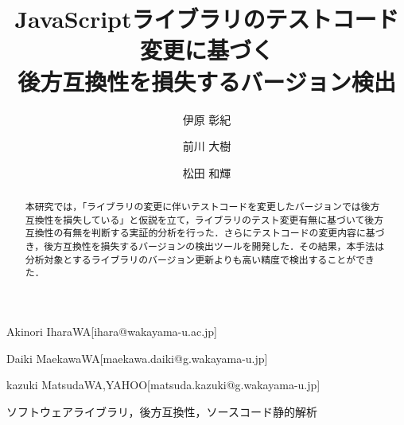 \documentclass[submit]{ipsj}
\begin{document}
\title{JavaScriptライブラリのテストコード変更に基づく\\後方互換性を損失するバージョン検出}





\author{伊原 彰紀}{Akinori Ihara}{WA}[ihara@wakayama-u.ac.jp]
\author{前川 大樹}{Daiki Maekawa}{WA}[maekawa.daiki@g.wakayama-u.jp]
\author{松田 和輝}{kazuki Matsuda}{WA,YAHOO}[matsuda.kazuki@g.wakayama-u.jp]

\begin{abstract}
本研究では，「ライブラリの変更に伴いテストコードを変更したバージョンでは後方互換性を損失している」と仮説を立て，ライブラリのテスト変更有無に基づいて後方互換性の有無を判断する実証的分析を行った．さらにテストコードの変更内容に基づき，後方互換性を損失するバージョンの検出ツールを開発した．その結果，本手法は分析対象とするライブラリのバージョン更新\textcolor{red}{}よりも高い精度で検出することができた．

\end{abstract}


\begin{jkeyword}
ソフトウェアライブラリ，後方互換性，ソースコード静的解析
\end{jkeyword}
\end{document}
